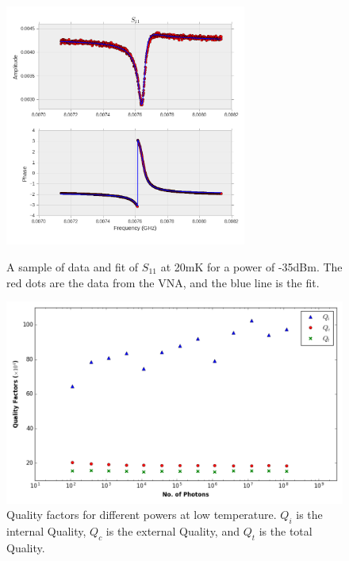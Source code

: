 \begin{figure}
\centering
\includegraphics[width=300px]{Figures/s11fit.png}
\decoRule
\caption[Sample $S_{11}$ fit]{A sample of data and fit of $S_{11}$ at 20mK for a power of -35dBm. The red dots are the data from the VNA, and the blue line is the fit.}
\label{fig:fit}

\centering
\includegraphics[width=\linewidth]{Figures/cold_qualities.png}
\decoRule
\caption[Quality Factors for different powers at low temperature]{Quality factors for different powers at low temperature. $Q_i$ is the internal Quality, $Q_c$ is the external Quality, and $Q_t$ is the total Quality.}
\label{fig:cold qualities}
\end{figure}